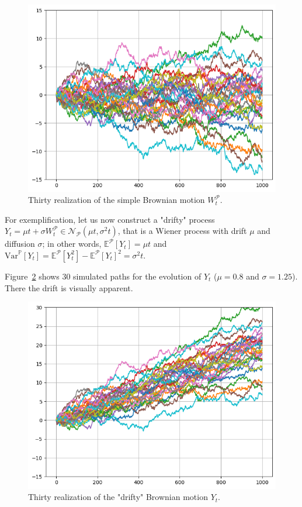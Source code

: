 \documentclass[12pt,a4paper]{article}
\begin{document}
\begin{figure}[htbp]
	\begin{center}
		\includegraphics[width=0.5\linewidth]{addons/brownian_motion_nodrift}
	\end{center}
	\label{fig:brownian_motion_nodrift}
	\caption{Thirty realization of the simple Brownian motion $W_t^{\mathcal{P}}$.}
\end{figure}

For exemplification, let us now construct a "drifty" process $Y_t=\mu t+\sigma W_t^{\mathcal{P}}\in \mathcal{N}_{\mathcal{P}}(\mu t, \sigma^2 t)$, that is a Wiener process with drift $\mu$ and diffusion $\sigma$; in other words, $\mathbb{E}^{\mathcal{P}}[Y_t]=\mu t$ and $\text{Var}^{\mathbb{P}}[Y_t]=\mathbb{E}^{\mathcal{P}}[Y^2_t]-\mathbb{E}^{\mathcal{P}}[Y_t]^2=\sigma^2 t$.

Figure~\ref{fig:brownian_motion_drift} shows 30 simulated paths for the evolution of $Y_t$ ($\mu = 0.8$ and $\sigma =1.25$). There the drift is visually apparent.
\begin{figure}[htbp]
\begin{center}
	\includegraphics[width=0.5\linewidth]{addons/brownian_motion_drift}
\end{center}
\label{fig:brownian_motion_drift}
	\caption{Thirty realization of the "drifty" Brownian motion $Y_t$.}
\end{figure}
\end{document}
